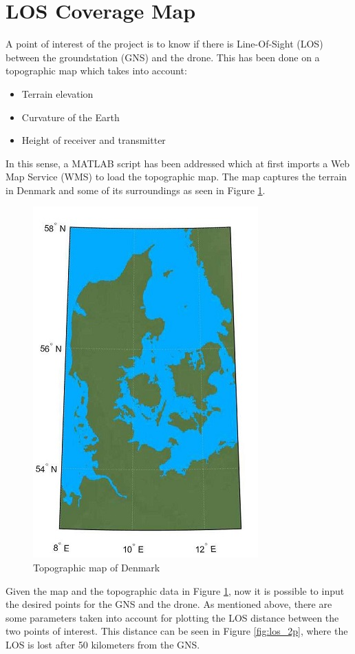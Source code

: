 \section{LOS Coverage Map}\label{sec:los_map}
A point of interest of the project is to know if there is Line-Of-Sight (LOS) between the groundstation (GNS) and the drone. This has been done on a topographic map which takes into account:

\begin{itemize}
	\item Terrain elevation
	\item Curvature of the Earth
	\item Height of receiver and transmitter
\end{itemize}

In this sense, a MATLAB script has been addressed which at first imports a Web Map Service (WMS) to load the topographic map. The map captures the terrain in Denmark and some of its surroundings as seen in Figure \ref{fig:dk_map}.

\begin{figure}[h]
	\centering
	\includegraphics[scale=2]{figures/denmark.jpg}
	\caption{Topographic map of Denmark}
   	\label{fig:dk_map}
\end{figure}

Given the map and the topographic data in Figure \ref{fig:dk_map}, now it is possible to input the desired points for the GNS and the drone. As mentioned above, there are some parameters taken into account for plotting the LOS distance between the two points of interest. This distance can be seen in Figure \ref{fig:los_2p}, where the LOS is lost after 50 kilometers from the GNS.


